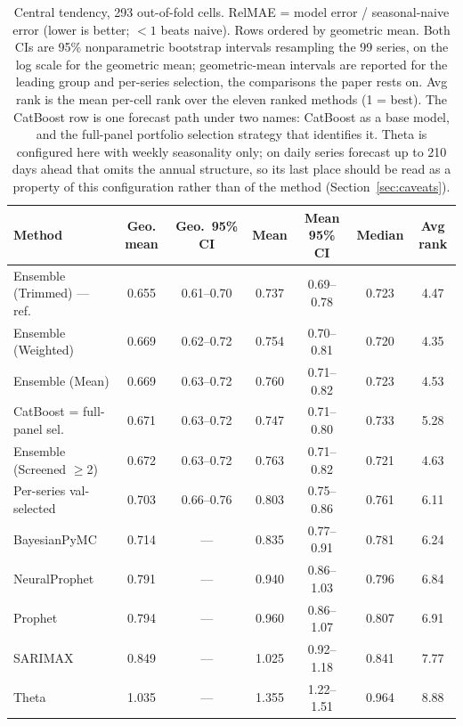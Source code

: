 \documentclass[11pt]{article}
\begin{document}
\begin{table}[htbp]\centering\small
\caption{Central tendency, 293 out-of-fold cells. RelMAE = model error / seasonal-naive error (lower is better; $<1$ beats naive). Rows ordered by geometric mean. Both CIs are 95\% nonparametric bootstrap intervals resampling the 99 series, on the log scale for the geometric mean; geometric-mean intervals are reported for the leading group and per-series selection, the comparisons the paper rests on. Avg rank is the mean per-cell rank over the eleven ranked methods (1 = best). The CatBoost row is one forecast path under two names: CatBoost as a base model, and the full-panel portfolio selection strategy that identifies it. Theta is configured here with weekly seasonality only; on daily series forecast up to 210 days ahead that omits the annual structure, so its last place should be read as a property of this configuration rather than of the method (Section~\ref{sec:caveats}).}
\label{tab:central}
\begin{tabular}{lcccccc}
\toprule
Method & Geo. mean & Geo.\ 95\% CI & Mean & Mean 95\% CI & Median & Avg rank \\
\midrule
Ensemble (Trimmed) --- ref. & 0.655 & 0.61--0.70 & 0.737 & 0.69--0.78 & 0.723 & 4.47 \\
Ensemble (Weighted) & 0.669 & 0.62--0.72 & 0.754 & 0.70--0.81 & 0.720 & 4.35 \\
Ensemble (Mean) & 0.669 & 0.63--0.72 & 0.760 & 0.71--0.82 & 0.723 & 4.53 \\
CatBoost = full-panel sel. & 0.671 & 0.63--0.72 & 0.747 & 0.71--0.80 & 0.733 & 5.28 \\
Ensemble (Screened $\geq$2) & 0.672 & 0.63--0.72 & 0.763 & 0.71--0.82 & 0.721 & 4.63 \\
Per-series val-selected & 0.703 & 0.66--0.76 & 0.803 & 0.75--0.86 & 0.761 & 6.11 \\
BayesianPyMC & 0.714 & --- & 0.835 & 0.77--0.91 & 0.781 & 6.24 \\
NeuralProphet & 0.791 & --- & 0.940 & 0.86--1.03 & 0.796 & 6.84 \\
Prophet & 0.794 & --- & 0.960 & 0.86--1.07 & 0.807 & 6.91 \\
SARIMAX & 0.849 & --- & 1.025 & 0.92--1.18 & 0.841 & 7.77 \\
Theta & 1.035 & --- & 1.355 & 1.22--1.51 & 0.964 & 8.88 \\
\bottomrule
\end{tabular}
\end{table}
\end{document}
